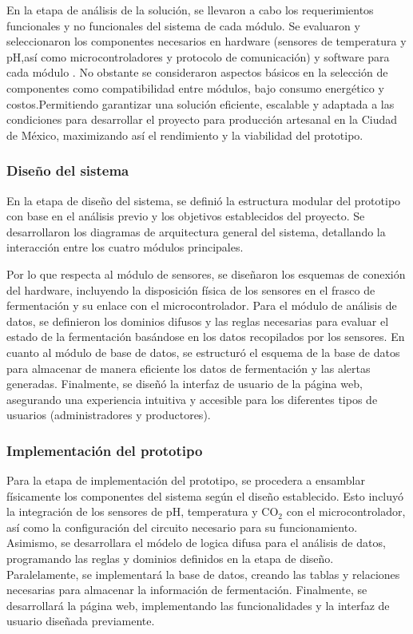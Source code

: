 En la etapa de análisis de la solución, se llevaron a cabo los requerimientos
funcionales y no funcionales del sistema de cada módulo. Se evaluaron y seleccionaron los 
componentes necesarios en hardware (sensores de temperatura y pH,así como microcontroladores 
y protocolo de comunicación) y software para cada módulo .
No obstante se consideraron aspectos básicos en la selección de componentes como compatibilidad 
entre módulos, bajo consumo energético y costos.Permitiendo garantizar 
una solución eficiente, escalable y adaptada a las condiciones para desarrollar el proyecto
para producción artesanal 
en la Ciudad de México, maximizando así el rendimiento y la viabilidad del prototipo.

 \subsubsection{Diseño del sistema}

En la etapa de diseño del sistema, se definió la estructura modular del prototipo con base en
el análisis previo y los objetivos establecidos del proyecto. Se desarrollaron los diagramas 
de arquitectura general del sistema, detallando la interacción entre los cuatro módulos principales.

Por lo que respecta al módulo de sensores, se diseñaron los esquemas de conexión del hardware,
incluyendo la disposición física de los sensores en el frasco de fermentación y su enlace con
el microcontrolador. Para el módulo de análisis de datos, se definieron los dominios difusos y las reglas
necesarias para evaluar el estado de la fermentación basándose en los datos recopilados por
los sensores. En cuanto al módulo de base de datos, se estructuró el esquema de la base de datos
para almacenar de manera eficiente los datos de fermentación y las alertas generadas. Finalmente,
se diseñó la interfaz de usuario de la página web, asegurando una experiencia intuitiva y
accesible para los diferentes tipos de usuarios (administradores y productores).

\subsubsection{Implementación del prototipo}
Para la etapa de implementación del prototipo, se procedera a ensamblar físicamente los componentes
del sistema según el diseño establecido. Esto incluyó la integración de los sensores de pH,
temperatura y CO$_2$ con el microcontrolador, así como la configuración del circuito necesario para su funcionamiento.
Asimismo, se desarrollara el módelo de logica difusa para el análisis de datos, programando las reglas y dominios
definidos en la etapa de diseño. Paralelamente, se implementará la base de datos, creando las tablas y relaciones necesarias para almacenar la información de fermentación.
Finalmente, se desarrollará la página web, implementando las funcionalidades y la interfaz de usuario diseñada previamente.

